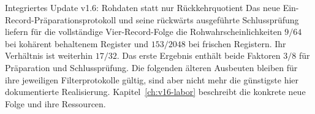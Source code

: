 \begin{bild}{Integriertes Update v1.6: Rohdaten statt nur Rückkehrquotient}
Das neue Ein-Record-Präparationsprotokoll und seine rückwärts ausgeführte Schlussprüfung liefern für die vollständige Vier-Record-Folge die Rohwahrscheinlichkeiten $9/64$ bei kohärent behaltenem Register und $153/2048$ bei frischen Registern. Ihr Verhältnis ist weiterhin $17/32$. Das erste Ergebnis enthält beide Faktoren $3/8$ für Präparation und Schlussprüfung. Die folgenden älteren Ausbeuten bleiben für ihre jeweiligen Filterprotokolle gültig, sind aber nicht mehr die günstigste hier dokumentierte Realisierung. Kapitel~\ref{ch:v16-labor} beschreibt die konkrete neue Folge und ihre Ressourcen.
\end{bild}
